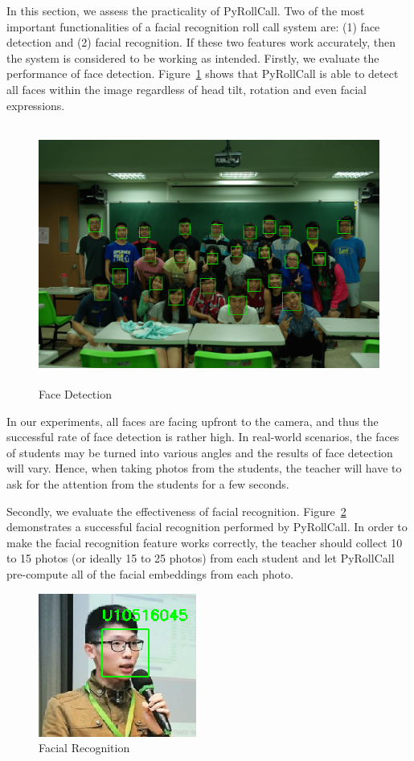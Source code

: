 In this section, we assess the practicality of PyRollCall. Two of the most important
functionalities of a facial recognition roll call system are: (1) face detection
and (2) facial recognition. If these two features work accurately, then the system
is considered to be working as intended. Firstly, we evaluate the performance of face detection.
Figure~\ref{fig:face-detection-test} shows that PyRollCall is able to detect all faces
within the image regardless of head tilt, rotation and even facial expressions.
\vspace{0.2cm}

\begin{figure}[!htb]
  \centering
  \includegraphics[height=8.5cm]{figures/face-detection-test.png}
  \caption{Face Detection}
  \label{fig:face-detection-test}
\end{figure}

In our experiments, all faces are facing upfront to the camera, and thus the successful
rate of face detection is rather high. In real-world scenarios, the faces of students
may be turned into various angles and the results of face detection will vary. Hence,
when taking photos from the students, the teacher will have to ask for the attention from
the students for a few seconds.
\vspace{0.5cm}

Secondly, we evaluate the effectiveness of facial recognition. Figure~\ref{fig:facial-recog-test}
demonstrates a successful facial recognition performed by PyRollCall. In order to make
the facial recognition feature works correctly, the teacher should collect 10 to 15 photos
(or ideally 15 to 25 photos) from each student and let PyRollCall pre-compute all of the
facial embeddings from each photo.
\vspace{0.5cm}

\begin{figure}[!htb]
  \centering
  \includegraphics[]{figures/facial-recog-test.png}
  \caption{Facial Recognition}
  \label{fig:facial-recog-test}
\end{figure}
